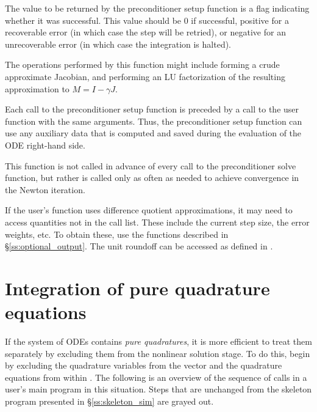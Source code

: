 {
  The value to be returned by the preconditioner setup function is a flag
  indicating whether it was successful.  This value should be $0$ if successful, 
  positive for a recoverable error (in which case the step will be retried), or
  negative for an unrecoverable error (in which case the integration is halted). 
}
{
  The operations performed by this function might include forming a crude 
  approximate Jacobian, and performing an LU factorization of the resulting
  approximation to $M=I - \gamma J$.

  Each call to the preconditioner setup function is preceded by a call to     
  the  user function with the same  arguments.  
  Thus, the preconditioner setup function can use any auxiliary data that is 
  computed and saved during the evaluation of the ODE right-hand side.
  
  This function is not called in advance of every call to the preconditioner
  solve function, but rather is called only as often as needed to achieve
  convergence in the Newton iteration. 

  If the user's  function uses difference quotient
  approximations, it may need to access quantities not in the call
  list. These include the current step size, the error weights, etc.
  To obtain these, use the  functions described in
  \S\ref{ss:optional_output}. The unit roundoff can be accessed
  as  defined in .
}

\section{Integration of pure quadrature equations}

If the system of ODEs contains {\em pure quadratures}, it is more efficient
to treat them separately by excluding them from the nonlinear solution stage. 
To do this, begin by excluding the quadrature variables from the vector 
and the quadrature equations from within . The following is an overview of 
the sequence of calls in a user's main program in this situation. Steps that are
unchanged from the skeleton program presented in \S\ref{ss:skeleton_sim} are 
grayed out.

